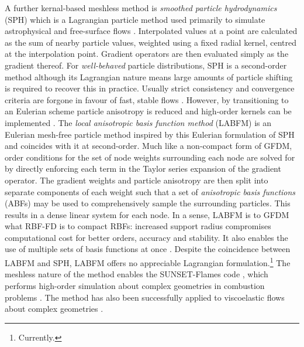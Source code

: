 A further kernal-based meshless method is \emph{smoothed particle hydrodynamics} (SPH) which is a Lagrangian particle method used primarily to simulate astrophysical and free-surface flows \cite{monaghan1992SmoothedParticleHydrodynamics, lind2020ReviewSmoothedParticle}. Interpolated values at a point are calculated as the sum of nearby particle values, weighted using a fixed radial kernel, centred at the interpolation point. Gradient operators are then evaluated simply as the gradient thereof. For \emph{well-behaved} particle distributions, SPH is a second-order method although its Lagrangian nature means large amounts of particle shifting is required to recover this in practice. Usually strict consistency and convergence criteria are forgone in favour of fast, stable flows \cite{vacondio2021GrandChallengesSmoothed}. However, by transitioning to an Eulerian scheme particle anisotropy is reduced and high-order kernels can be implemented \cite{lind2016HighorderEulerianIncompressible}. The \emph{local anisotropic basis function method} (LABFM) is an Eulerian mesh-free particle method inspired by this Eulerian formulation of SPH and coincides with it at second-order. Much like a non-compact form of GFDM, order conditions for the set of node weights surrounding each node are solved for by directly enforcing each term in the Taylor series expansion of the gradient operator. The gradient weights and particle anisotropy are then split into separate components of each weight such that a set of \emph{anisotropic basis functions} (ABFs) may be used to comprehensively sample the surrounding particles. This results in a dense linear system for each node. In a sense, LABFM is to GFDM what RBF-FD is to compact RBFs: increased support radius compromises computational cost for better orders, accuracy and stability. It also enables the use of multiple sets of basis functions at once . Despite the coincidence between LABFM and SPH, LABFM offers no appreciable Lagrangian formulation.\footnote{Currently.} The meshless nature of the method enables the SUNSET-Flames code \cite{kingSunsetFlames}, which performs high-order simulation about complex geometries \cite{king2022HighOrderSimulationsIsothermal} in combustion problems \cite{king2024MeshFreeFrameworkHighOrdera, broadley2025HighorderMeshfreeDirect}. The method has also been successfully applied to viscoelastic flows about complex geometries \cite{king2024MeshFreeFrameworkHighOrder}.





